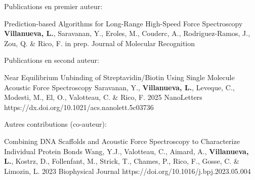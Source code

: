 
\begin{cvpublications}{Publications en premier auteur:}

{Prediction-based Algorithms for Long-Range High-Speed Force Spectroscopy}
{\textbf{Villanueva, L.}, Saravanan, Y., Eroles, M., Couderc, A., Rodriguez-Ramos, J., Zou, Q. \& Rico, F.}
{in prep.}
    {Journal of Molecular Recognition}
    {}

\end{cvpublications}

\begin{cvpublications}{Publications en second auteur:}

{Near Equilibrium Unbinding of Streptavidin/Biotin Using Single Molecule Acoustic Force Spectroscopy}
{Saravanan, Y., \textbf{Villanueva, L.}, Leveque, C., Modesti, M., El, O., Valotteau, C. \& Rico, F.}
{2025}
    {NanoLetters}
{https://dx.doi.org/10.1021/acs.nanolett.5c03736}

\end{cvpublications}

\begin{cvpublications}{Autres contributions (co-auteur):}

{Combining DNA Scaffolds and Acoustic Force Spectroscopy to Characterize Individual Protein Bonds}
{Wang, Y.J., Valotteau, C., Aimard, A., \textbf{Villanueva, L.}, Kostrz, D., Follenfant, M., Strick, T., Chames, P., Rico, F., Gosse, C. \& Limozin, L.}
{2023}
{Biophysical Journal}
{https://doi.org/10.1016/j.bpj.2023.05.004}

\end{cvpublications}
